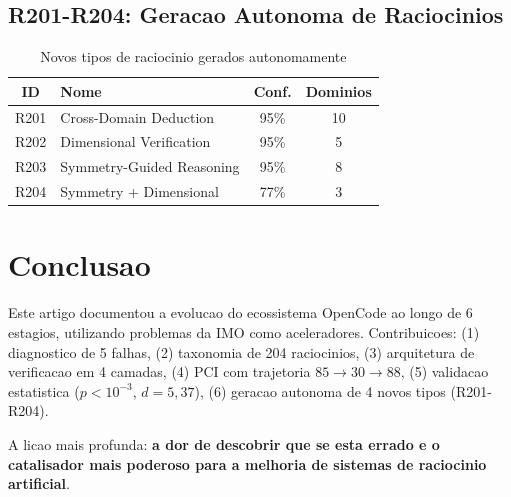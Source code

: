 \documentclass[5p]{elsarticle}
\begin{document}
\subsection{R201-R204: Geracao Autonoma de Raciocinios}

\begin{table}[H]
\centering
\caption{Novos tipos de raciocinio gerados autonomamente}
\label{tab:r201}
\small
\begin{tabular}{clcc}
\toprule
\textbf{ID} & \textbf{Nome} & \textbf{Conf.} & \textbf{Dominios}\\
\midrule
R201 & Cross-Domain Deduction & 95\% & 10\\
R202 & Dimensional Verification & 95\% & 5\\
R203 & Symmetry-Guided Reasoning & 95\% & 8\\
R204 & Symmetry + Dimensional & 77\% & 3\\
\bottomrule
\end{tabular}
\end{table}

\section{Conclusao}

Este artigo documentou a evolucao do ecossistema OpenCode ao longo de 6 estagios,
utilizando problemas da IMO como aceleradores. Contribuicoes: (1) diagnostico de
5 falhas, (2) taxonomia de 204 raciocinios, (3) arquitetura de verificacao em 4
camadas, (4) PCI com trajetoria $85\to30\to88$, (5) validacao estatistica
($p<10^{-3}$, $d=5,37$), (6) geracao autonoma de 4 novos tipos (R201-R204).

A licao mais profunda: \textbf{a dor de descobrir que se esta errado e o
catalisador mais poderoso para a melhoria de sistemas de raciocinio artificial}.
\end{document}
